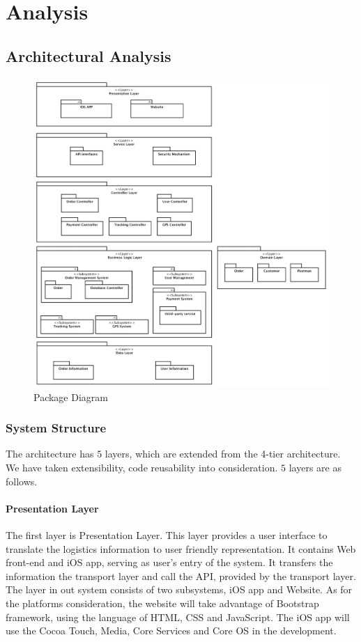 \documentclass[12pt]{scrreprt}
\begin{document}
\chapter{Analysis}
\section{Architectural Analysis}
\begin{figure}[H]
  \centering\includegraphics[width=6in]{DocumentRes/PackageDiagram.png}
  \caption{Package Diagram}
\end{figure}
\subsection{System Structure}
The architecture has $5$ layers, which are extended from the 4-tier architecture. We have taken extensibility, code reusability into consideration. $5$ layers are as follows.
\subsubsection{Presentation Layer}
The first layer is Presentation Layer. This layer provides a user interface to translate the logistics information to user friendly representation. It contains Web front-end and iOS app, serving as user's entry of the system. It transfers the information the transport layer and call the API, provided by the transport layer. The layer in out system consists of two subsystems, iOS app and Website. As for the platforms consideration, the website will take advantage of Bootstrap framework, using the language of HTML, CSS and JavaScript. The iOS app will use the Cocoa Touch, Media, Core Services and Core OS in the development.
\end{document}
